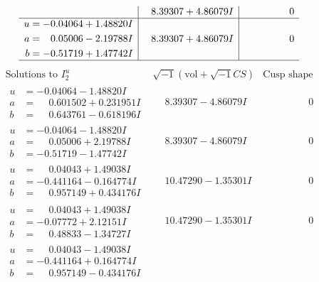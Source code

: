 \documentclass[1p]{elsarticle_modified}
\theoremstyle{definition}
\newcommand{\I}{\sqrt{-1}}
\begin{document}
$$\begin{array}{c|c|c}
 & \phantom{-}8.39307 + 4.86079 I & \phantom{-0.000000 } 0 \\ \hline\begin{aligned}
u &= -0.04064 + 1.48820 I \\
a &= \phantom{-}0.05006 - 2.19788 I \\
b &= -0.51719 + 1.47742 I\end{aligned}
 & \phantom{-}8.39307 + 4.86079 I & \phantom{-0.000000 } 0\\
 \hline 
 \end{array}$$\newpage$$\begin{array}{c|c|c}  
\text{Solutions to }I^u_{2}& \I (\text{vol} + \sqrt{-1}CS) & \text{Cusp shape}\\
 \hline 
\begin{aligned}
u &= -0.04064 - 1.48820 I \\
a &= \phantom{-}0.601502 + 0.231951 I \\
b &= \phantom{-}0.643761 - 0.618196 I\end{aligned}
 & \phantom{-}8.39307 - 4.86079 I & \phantom{-0.000000 } 0 \\ \hline\begin{aligned}
u &= -0.04064 - 1.48820 I \\
a &= \phantom{-}0.05006 + 2.19788 I \\
b &= -0.51719 - 1.47742 I\end{aligned}
 & \phantom{-}8.39307 - 4.86079 I & \phantom{-0.000000 } 0 \\ \hline\begin{aligned}
u &= \phantom{-}0.04043 + 1.49038 I \\
a &= -0.441164 - 0.164774 I \\
b &= \phantom{-}0.957149 + 0.434176 I\end{aligned}
 & \phantom{-}10.47290 - 1.35301 I & \phantom{-0.000000 } 0 \\ \hline\begin{aligned}
u &= \phantom{-}0.04043 + 1.49038 I \\
a &= -0.07772 + 2.12151 I \\
b &= \phantom{-}0.48833 - 1.34727 I\end{aligned}
 & \phantom{-}10.47290 - 1.35301 I & \phantom{-0.000000 } 0 \\ \hline\begin{aligned}
u &= \phantom{-}0.04043 - 1.49038 I \\
a &= -0.441164 + 0.164774 I \\
b &= \phantom{-}0.957149 - 0.434176 I\end{aligned}

\end{array}$$
\end{document}
